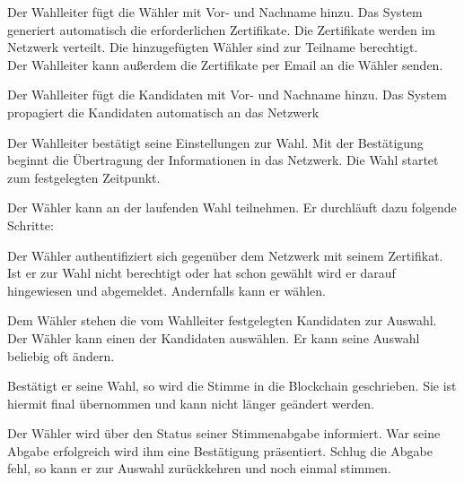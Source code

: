 \documentclass[parskip=full,11pt,twoside]{scrartcl}
\begin{document}
Der Wahlleiter fügt die Wähler mit Vor- und Nachname hinzu. Das System generiert automatisch die erforderlichen Zertifikate. Die Zertifikate werden im Netzwerk verteilt. Die hinzugefügten Wähler sind zur Teilname berechtigt. \\
Der Wahlleiter kann außerdem die Zertifikate per Email an die Wähler senden. %

Der Wahlleiter fügt die Kandidaten mit Vor- und Nachname hinzu. Das System propagiert die Kandidaten automatisch an das Netzwerk

Der Wahlleiter bestätigt seine Einstellungen zur Wahl. Mit der Bestätigung beginnt die Übertragung der Informationen in das Netzwerk. Die Wahl startet zum festgelegten Zeitpunkt.

Der Wähler kann an der laufenden Wahl teilnehmen. Er durchläuft dazu folgende Schritte:

Der Wähler authentifiziert sich gegenüber dem Netzwerk mit seinem Zertifikat.
Ist er zur Wahl nicht berechtigt oder hat schon gewählt wird er darauf hingewiesen und abgemeldet.
Andernfalls kann er wählen.

Dem Wähler stehen die vom Wahlleiter festgelegten Kandidaten zur Auswahl.
Der Wähler kann einen der Kandidaten auswählen.
Er kann seine Auswahl beliebig oft ändern.

Bestätigt er seine Wahl, so wird die Stimme in die Blockchain geschrieben.
Sie ist hiermit final übernommen und kann nicht länger geändert werden.

Der Wähler wird über den Status seiner Stimmenabgabe informiert.
War seine Abgabe erfolgreich wird ihm eine Bestätigung präsentiert.
Schlug die Abgabe fehl, so kann er zur Auswahl zurückkehren und noch einmal stimmen.
\end{document}

